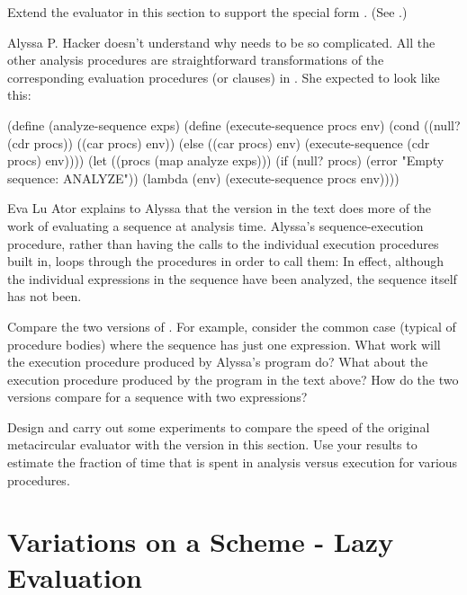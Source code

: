 \begin{exerciseGroup}
\label{Exercise 4.22}
 Extend the evaluator in this
section to support the special form .  (See .)

\label{Exercise 4.23}
 Alyssa P. Hacker doesn't
understand why  needs to be so complicated.  All the
other analysis procedures are straightforward transformations of the
corresponding evaluation procedures (or  clauses) in
.  She expected  to look like this:

\begin{codeBlock}
(define (analyze-sequence exps)
  (define (execute-sequence procs env)
    (cond ((null? (cdr procs))
           ((car procs) env))
          (else
           ((car procs) env)
           (execute-sequence (cdr procs) env))))
  (let ((procs (map analyze exps)))
    (if (null? procs)
        (error "Empty sequence: ANALYZE"))
    (lambda (env)
      (execute-sequence procs env))))
\end{codeBlock}

Eva Lu Ator explains to Alyssa that the version in the text does more of the
work of evaluating a sequence at analysis time.  Alyssa's sequence-execution
procedure, rather than having the calls to the individual execution procedures
built in, loops through the procedures in order to call them: In effect,
although the individual expressions in the sequence have been analyzed, the
sequence itself has not been.

Compare the two versions of .  For example, consider the
common case (typical of procedure bodies) where the sequence has just one
expression.  What work will the execution procedure produced by Alyssa's
program do?  What about the execution procedure produced by the program in the
text above?  How do the two versions compare for a sequence with two
expressions?

\label{Exercise 4.24}
 Design and carry out some
experiments to compare the speed of the original metacircular evaluator with
the version in this section.  Use your results to estimate the fraction of time
that is spent in analysis versus execution for various procedures.
\end{exerciseGroup}

\section{Variations on a Scheme - Lazy Evaluation}
\label{Section 4.2}

